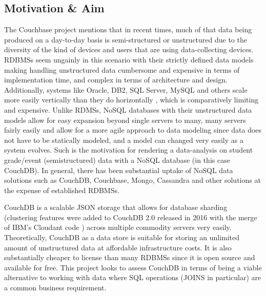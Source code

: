 \subsection{Motivation \& Aim}
The Couchbase project \cite{couchbaseWhitePaper} mentions that in recent times, much of that data being produced on a day-to-day basis is semi-structured or unstructured due to the diversity of the kind of devices and users that are using data-collecting devices. RDBMSs seem ungainly in this scenario with their strictly defined data models making handling unstructured data cumbersome and expensive in terms of implementation time, and complex in terms of architecture and design. Additionally, systems like Oracle, DB2, SQL Server, MySQL and others scale more easily vertically than they do horizontally \cite{couchbaseWhitePaper}, which is comparatively limiting and expensive. Unlike RDMSs, NoSQL databases with their unstructured data models allow for easy expansion beyond single servers to many, many servers fairly easily and allow for a more agile approach to data modeling since data does not have to be statically modeled, and a model can changed very easily as a system evolves. Such is the motivation for rendering a data-analysis on student grade/event (semistructured) data with a NoSQL database (in this case CouchDB). In general, there has been substantial uptake of NoSQL data solutions such as CouchDB, Couchbase, Mongo, Cassandra and other solutions at the expense of established RDBMSs.

CouchDB is a scalable JSON storage that allows for database sharding (clustering features were added to CouchDB 2.0 released in 2016 with the merge of IBM's Cloudant code \cite{couchdb2.0}) across multiple commodity servers very easily. Theoretically, CouchDB as a data store is suitable for storing an unlimited amount of unstructured data at affordable infrastructure costs. It is also substantially cheaper to license than many RDBMSs since it is open source and available for free. This project looks to assess CouchDB in terms of being a viable alternative to working with data where SQL operations (JOINS in particular) are a common business requirement.


